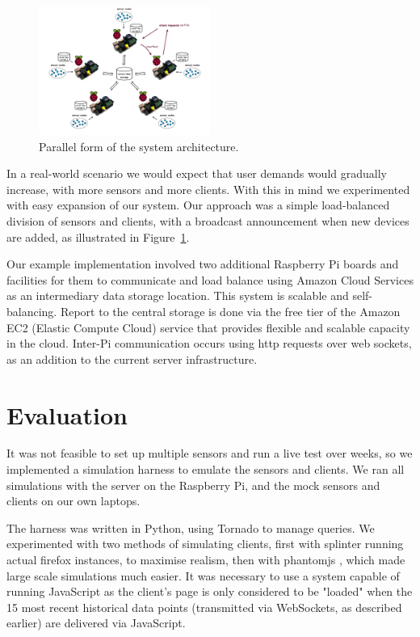 \documentclass[a4paper]{acm_proc_article-sp}
\begin{document}
\begin{figure}
  \centering
      \includegraphics[width=0.5\textwidth]{architecture.png}
  \caption{\label{fig:parallel}Parallel form of the system architecture.}
\end{figure}

In a real-world scenario we would expect that user demands would gradually increase, with more sensors and more clients.  With this in mind we experimented with easy expansion of our system.  Our approach was a simple load-balanced division of sensors and clients, with a broadcast announcement when new devices are added, as illustrated in Figure~\ref{fig:parallel}.

Our example implementation involved two additional Raspberry Pi boards and facilities for them to communicate and load balance using Amazon Cloud Services as an intermediary data storage location.  This system is scalable and self-balancing.  Report to the central storage is done via the free tier of the Amazon EC2 (Elastic Compute Cloud) service that provides flexible and scalable capacity in the cloud.  Inter-Pi communication occurs using http requests over web sockets, as an addition to the current server infrastructure.

\section{Evaluation}

It was not feasible to set up multiple sensors and run a live test over weeks, so we implemented a simulation harness to emulate the sensors and clients.  We ran all simulations with the server on the Raspberry Pi, and the mock sensors and clients on our own laptops. 

The harness was written in Python, using Tornado to manage queries.  We experimented with two methods of simulating clients, first with splinter \cite{} running actual firefox instances, to maximise realism, then with phantomjs \cite{}, which made large scale simulations much easier.  It was necessary to use a system capable of running JavaScript as the client's page is only considered to be "loaded" when the 15 most recent historical data points (transmitted via WebSockets, as described earlier) are delivered via JavaScript.
\end{document}
